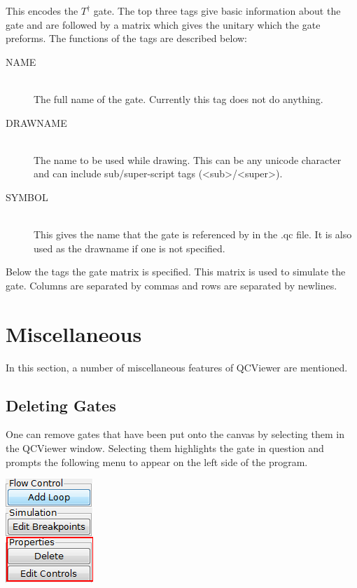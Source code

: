 \documentclass[10pt]{article}
\theoremstyle{definition}
\begin{document}
This encodes the $T^\dagger$ gate. The top three tags give basic information about the gate and 
are followed by a matrix which gives the unitary which the gate preforms.  The functions of the 
tags are described below:
\begin{description}
\item[NAME] \hfill \\
The full name of the gate.  Currently this tag does not do anything.
\item[DRAWNAME] \hfill \\
The name to be used while drawing.  This can be any unicode character 
and can include sub/super-script tags (<sub>/<super>).
\item[SYMBOL] \hfill \\
This gives the name that the gate is referenced by in the .qc file.  It is also used as the drawname if one is not
specified.
\end{description}
Below the tags the gate matrix is specified.  This matrix is used to simulate the gate.  Columns are separated by commas
and rows are separated by newlines.


\section{Miscellaneous}\label{sec:Miscellaneous}

In this section, a number of miscellaneous features of QCViewer are mentioned.

\subsection{Deleting Gates}

One can remove gates that have been put onto the canvas by selecting them in the QCViewer window. Selecting them highlights the gate in question and prompts the following menu to appear on the left side of the program.

\begin{center}
\includegraphics{Figures/Misc/DeleteMenu.png}
\end{center}
\end{document}
